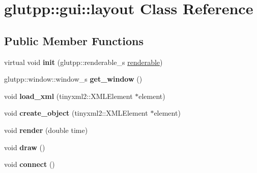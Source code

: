 \hypertarget{classglutpp_1_1gui_1_1layout}{\section{glutpp\-:\-:gui\-:\-:layout \-Class \-Reference}
\label{classglutpp_1_1gui_1_1layout}
}
\subsection*{\-Public \-Member \-Functions}
\begin{DoxyCompactItemize}
\item 
\hypertarget{classglutpp_1_1gui_1_1layout_a345b890beed99a2cbf28f4aef78171bc}{virtual void {\bfseries init} (glutpp\-::renderable\-\_\-s \hyperlink{classglutpp_1_1renderable}{renderable})}\label{classglutpp_1_1gui_1_1layout_a345b890beed99a2cbf28f4aef78171bc}

\item 
\hypertarget{classglutpp_1_1gui_1_1layout_a37cb12d529360e0d15dae6caa8100b55}{glutpp\-::window\-::window\-\_\-s {\bfseries get\-\_\-window} ()}\label{classglutpp_1_1gui_1_1layout_a37cb12d529360e0d15dae6caa8100b55}

\item 
\hypertarget{classglutpp_1_1gui_1_1layout_abd6f4b04ebb31c52ebf6922989fdd869}{void {\bfseries load\-\_\-xml} (tinyxml2\-::\-X\-M\-L\-Element $\ast$element)}\label{classglutpp_1_1gui_1_1layout_abd6f4b04ebb31c52ebf6922989fdd869}

\item 
\hypertarget{classglutpp_1_1gui_1_1layout_a445fdfb2f67886454e29bf52011a4f46}{void {\bfseries create\-\_\-object} (tinyxml2\-::\-X\-M\-L\-Element $\ast$element)}\label{classglutpp_1_1gui_1_1layout_a445fdfb2f67886454e29bf52011a4f46}

\item 
\hypertarget{classglutpp_1_1gui_1_1layout_a36e5373962c69242b86849fa32f01d62}{void {\bfseries render} (double time)}\label{classglutpp_1_1gui_1_1layout_a36e5373962c69242b86849fa32f01d62}

\item 
\hypertarget{classglutpp_1_1gui_1_1layout_af8e1c6e8812556b7b6d378b54c2e543a}{void {\bfseries draw} ()}\label{classglutpp_1_1gui_1_1layout_af8e1c6e8812556b7b6d378b54c2e543a}

\item 
\hypertarget{classglutpp_1_1gui_1_1layout_aa3ed6f6dcce6fa855fe21b5981ae3675}{void {\bfseries connect} ()}\label{classglutpp_1_1gui_1_1layout_aa3ed6f6dcce6fa855fe21b5981ae3675}


\end{DoxyCompactItemize}

